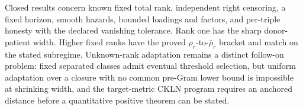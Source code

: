 Closed results concern known fixed total rank, independent right censoring, a fixed horizon, smooth hazards, bounded loadings and factors, and per-triple honesty with the declared vanishing tolerance.  Rank one has the sharp donor-patient width.  Higher fixed ranks have the proved \(\rho_r\)-to-\(\bar\rho_r\) bracket and match on the stated subregime.  Unknown-rank adaptation remains a distinct follow-on problem: fixed separated classes admit eventual threshold selection, but uniform adaptation over a closure with no common pre-Gram lower bound is impossible at shrinking width, and the target-metric CKLN program requires an anchored distance before a quantitative positive theorem can be stated.